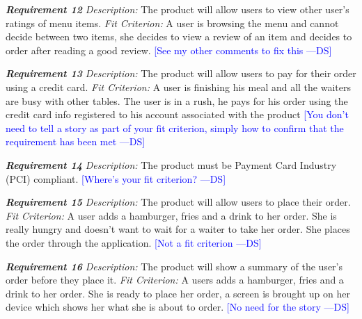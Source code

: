 \documentclass[12pt, titlepage]{article}
\newcommand{\authornote}[3]{\textcolor{#1}{[#3 ---#2]}}
\newcommand{\authornote}[3]{}
\newcommand{\ds}[1]{\authornote{blue}{DS}{#1}}
\begin{document}
\noindent\textbf{\textit{Requirement 12}}\newline
\textit{Description:}\newline
The product will allow users to view other user's ratings of menu items. \newline\newline
\textit{Fit Criterion:}\newline 
A user is browsing the menu and cannot decide between two items, she decides to view a review of an item and decides to order after reading a good review.
\ds{See my other comments to fix this}
\newline

\noindent\textbf{\textit{Requirement 13}}\newline
\textit{Description:}\newline
The product will allow users to pay for their order using a credit card. \newline\newline
\textit{Fit Criterion:}\newline 
A user is finishing his meal and all the waiters are busy with other tables. The user is in a rush, he pays for his order using the credit card info registered to his account associated with the product
\ds{You don't need to tell a story as part of your fit criterion, simply how
to confirm that the requirement has been met}
\newline

\noindent\textbf{\textit{Requirement 14}}\newline
\textit{Description:}\newline
The product must be Payment Card Industry (PCI) compliant.
\ds{Where's your fit criterion?}
\newline

\noindent\textbf{\textit{Requirement 15}}\newline
\textit{Description:}\newline
The product will allow users to place their order. \newline\newline
\textit{Fit Criterion:}\newline 
A user adds a hamburger, fries and a drink to her order. She is really hungry and doesn't want to wait for a waiter to take her order. She places the order through the application. \ds{Not a fit criterion}
\newline

\noindent\textbf{\textit{Requirement 16}}\newline
\textit{Description:}\newline
The product will show a summary of the user's order before they place it. \newline\newline
\textit{Fit Criterion:}\newline 
A users adds a hamburger, fries and a drink to her order. She is ready to place her order, a screen is brought up on her device which shows her what she is about to order.
\newline \ds{No need for the story}
\end{document}
